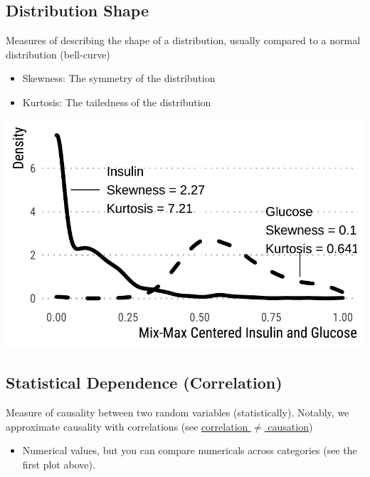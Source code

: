 \documentclass[
  letterpaper,
  DIV=11,
  numbers=noendperiod]{scrreprt}
\providecommand{\tightlist}{%
  \setlength{\itemsep}{0pt}\setlength{\parskip}{0pt}}\usepackage{longtable,booktabs,array}
\begin{document}
\hypertarget{sec-DistShape}{%
\subsection{Distribution Shape}\label{sec-DistShape}}

Measures of describing the shape of a distribution, usually compared to
a normal distribution (bell-curve)

\begin{itemize}
\item
  Skewness: The symmetry of the distribution
\item
  Kurtosis: The tailedness of the distribution
\end{itemize}

\includegraphics{./intro_files/figure-pdf/unnamed-chunk-11-1.pdf}

\hypertarget{statistical-dependence-correlation}{%
\subsection{Statistical Dependence
(Correlation)}\label{statistical-dependence-correlation}}

Measure of causality between two random variables (statistically).
Notably, we approximate causality with correlations (see
\href{https://en.wikipedia.org/wiki/Correlation_does_not_imply_causation\#:~:text=The\%20phrase\%20\%22correlation\%20does\%20not,association\%20or\%20correlation\%20between\%20them.}{correlation
\(\neq\) causation})

\begin{itemize}
\tightlist
\item
  Numerical values, but you can compare numericals across categories
  (see the first plot above).
\end{itemize}
\end{document}
